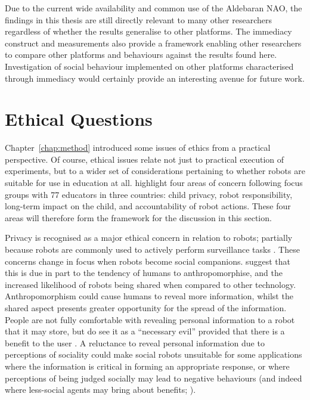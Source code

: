 Due to the current wide availability and common use of the Aldebaran NAO, the findings in this thesis are still directly relevant to many other researchers regardless of whether the results generalise to other platforms. The immediacy construct and measurements also provide a framework enabling other researchers to compare other platforms and behaviours against the results found here. Investigation of social behaviour implemented on other platforms characterised through immediacy would certainly provide an interesting avenue for future work.

\section{Ethical Questions} \label{sec:ch10-ethics}
Chapter~\ref{chap:method} introduced some issues of ethics from a practical perspective. Of course, ethical issues relate not just to practical execution of experiments, but to a wider set of considerations pertaining to whether robots are suitable for use in education at all. \citet{serholt2016classroom} highlight four areas of concern following focus groups with 77 educators in three countries: child privacy, robot responsibility, long-term impact on the child, and accountability of robot actions. These four areas will therefore form the framework for the discussion in this section.

Privacy is recognised as a major ethical concern in relation to robots; partially because robots are commonly used to actively perform surveillance tasks \citep{calo2011privacy}. These concerns change in focus when robots become social companions. \citet{lee2011understanding} suggest that this is due in part to the tendency of humans to anthropomorphise, and the increased likelihood of robots being shared when compared to other technology. Anthropomorphism could cause humans to reveal more information, whilst the shared aspect presents greater opportunity for the spread of the information. People are not fully comfortable with revealing personal information to a robot that it may store, but do see it as a ``necessary evil'' provided that there is a benefit to the user \citep{syrdal2007he}. A reluctance to reveal personal information due to perceptions of sociality could make social robots unsuitable for some applications where the information is critical in forming an appropriate response, or where perceptions of being judged socially may lead to negative behaviours (and indeed where less-social agents may bring about benefits; \citealp{howley2014effects}).

